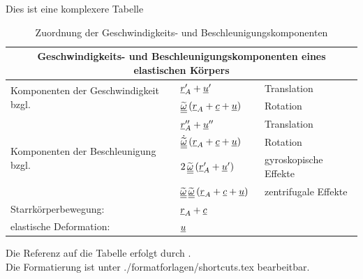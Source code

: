 %
Dies ist eine komplexere Tabelle
\begin{table}[H]
    \renewcommand{\arraystretch}{1.5} %
    \caption{Zuordnung der Geschwindigkeits- und Beschleunigungskomponenten}%
    \label{tab:komplexere_tabelle}%
    \vspace{0.5cm}
    \begin{tabular}{|l|l|l|}
        \hline
        \multicolumn{3}{|c|}{Geschwindigkeits- und Beschleunigungskomponenten eines elastischen Körpers}\\%
        \hline %
        \multirow{2}{*}{Komponenten der Geschwindigkeit bzgl.} & $\underline{r}_A' + \underline{u}'$ & Translation\\%
        \cline{2-3}
                                                               & $\widetilde{\underline{\underline{\omega}}} \, (\underline{r}_A + \underline{c} + \underline{u})$ & Rotation\\%
        \hline %
        \multirow{4}{*}{Komponenten der Beschleunigung bzgl.} & $\underline{r}_A'' + \underline{u}''$ & Translation\\%
        \cline{2-3}
                                                               & $\dot{\widetilde{\underline{\underline{\omega}}}} \, (\underline{r}_A + \underline{c} + \underline{u})$ & Rotation\\%
        \cline{2-3}
                                                               & $2\,\widetilde{\underline{\underline{\omega}}} \, (\underline{r}_A' + \underline{u}')$ & gyroskopische Effekte\\%
        \cline{2-3}
                                                               & $\widetilde{\underline{\underline{\omega}}} \, \widetilde{\underline{\underline{\omega}}} \, (\underline{r}_A + \underline{c} + \underline{u})$ & zentrifugale Effekte\\%
        \hline%
        \multicolumn{1}{|l|}{Starrkörperbewegung: }& \multicolumn{2}{l|}{ $\underline{r}_A + \underline{c}$}\\%
        \multicolumn{1}{|l|}{elastische Deformation: } & \multicolumn{2}{l|}{ $\underline{u}$}\\%
        \hline
    \end{tabular}
    \renewcommand{\arraystretch}{1.0} %
\end{table}
%
Die Referenz auf die Tabelle erfolgt durch .\\
Die Formatierung ist unter ./formatforlagen/shortcuts.tex bearbeitbar.\\\\\\\\
%
\newpage
%
